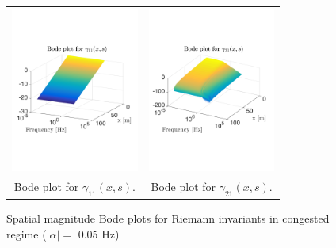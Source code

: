 \documentclass[5p,twocolumn]{elsarticle}
\begin{document}
\begin{figure}
\centering
\begin{tabular}{cc}
\includegraphics[trim = 0mm 60mm 0mm 60mm, width = 4.2cm]{distr_gamma_11}
&
\includegraphics[trim = 0mm 60mm 0mm 60mm, width = 4.2cm]{distr_gamma_21}
\tabularnewline
Bode plot for $\gamma_{11}(x,s)$.
&
Bode plot for $\gamma_{21}(x,s)$.
\tabularnewline
\end{tabular}
\caption{Spatial magnitude Bode plots for Riemann invariants in congested regime ($\left|\alpha\right| = $ 0.05 Hz)\label{fig:Magn_spatial_diag_congested}}
\end{figure}
\end{document}
